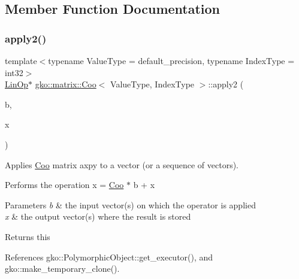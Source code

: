 \subsection{Member Function Documentation}
\mbox{\label{classgko_1_1matrix_1_1Coo_ad2e97eee0ad21f8896f4a82cc5ac8a50}} 
\subsubsection{\texorpdfstring{apply2()}{apply2()}\hspace{0.1cm}{\footnotesize\ttfamily [1/4]}}
{\footnotesize\ttfamily template$<$typename Value\+Type = default\+\_\+precision, typename Index\+Type = int32$>$ \\
\hyperlink{classgko_1_1LinOp}{Lin\+Op}$\ast$ \hyperlink{classgko_1_1matrix_1_1Coo}{gko\+::matrix\+::\+Coo}$<$ Value\+Type, Index\+Type $>$\+::apply2 (\begin{DoxyParamCaption}\item[{const \hyperlink{classgko_1_1LinOp}{Lin\+Op} $\ast$}]{b,  }\item[{\hyperlink{classgko_1_1LinOp}{Lin\+Op} $\ast$}]{x }\end{DoxyParamCaption})}



Applies \hyperlink{classgko_1_1matrix_1_1Coo}{Coo} matrix axpy to a vector (or a sequence of vectors). 

Performs the operation x = \hyperlink{classgko_1_1matrix_1_1Coo}{Coo} $\ast$ b + x


\begin{DoxyParams}{Parameters}
{\em b} & the input vector(s) on which the operator is applied \\
\hline
{\em x} & the output vector(s) where the result is stored\\
\hline
\end{DoxyParams}
\begin{DoxyReturn}{Returns}
this 
\end{DoxyReturn}


References gko\+::\+Polymorphic\+Object\+::get\+\_\+executor(), and gko\+::make\+\_\+temporary\+\_\+clone().

\mbox{\label{classgko_1_1matrix_1_1Coo_a48b3fd46edc8b1770f2800e94871eb41}} 
